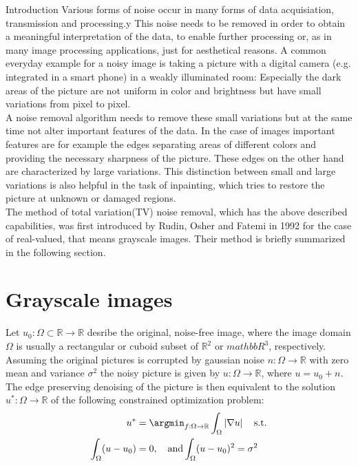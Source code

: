 \begin{chapter}{Introduction}
\label{ch:introduction}
Various forms of noise occur in many forms of data acquisiation, transmission and processing.y
This noise needs to be removed in order to obtain a meaningful interpretation of the data, to enable further processing or, as in many image processing 
applications, just for aesthetical reasons. A common everyday example for a noisy image is taking a picture with a digital camera (e.g. integrated in a smart phone) in a weakly illuminated room:
Especially the dark areas of the picture are not uniform in color and brightness but have small variations from pixel to pixel.\\

A noise removal algorithm needs to remove these small variations but at the same time not alter important features of the data. In the case of images important features are for example 
the edges separating areas of different colors and providing the necessary sharpness of the picture. These edges on the other hand are characterized by large variations. This distinction
between small and large variations is also helpful in the task of inpainting, which tries to restore the picture at unknown or damaged regions.\\

The method of total variation(TV) noise removal, which has the above described capabilities, was first introduced by Rudin, Osher and Fatemi \cite{RudinOsher} in 1992
for the case of real-valued, that means grayscale images. Their method is briefly summarized in the following section.

\section{Grayscale images}
Let $u_0: \Omega\subset \mathbb{R}\to \mathbb{R}$ desribe the original, noise-free image, where the image domain $\Omega$ is usually a rectangular or cuboid subset of $\mathbb{R}^2$ or $mathbb{R}^3$, respectively. 
Assuming the original pictures is corrupted by gaussian noise $n: \Omega\to\mathbb{R}$ with zero mean and variance $\sigma^2$ the noisy picture is given by $u: \Omega\to \mathbb{R}$, where
$u = u_0 + n$. The edge preserving denoising of the picture is then equivalent to the solution $u^* :\Omega\to \mathbb{R}$ of the following constrained optimization problem:
\begin{align}
    \label{osher_opt}
    u^* &= \argmin_{f: \Omega\to \mathbb{R}}\int_\Omega\left\vert\nabla u\right\vert  \quad\text{s.t.}\\
    \int_\Omega(u-u_0) &= 0, \quad\text{and} \int_\Omega(u-u_0)^2 = \sigma^2
\end{align}


\end{chapter}
